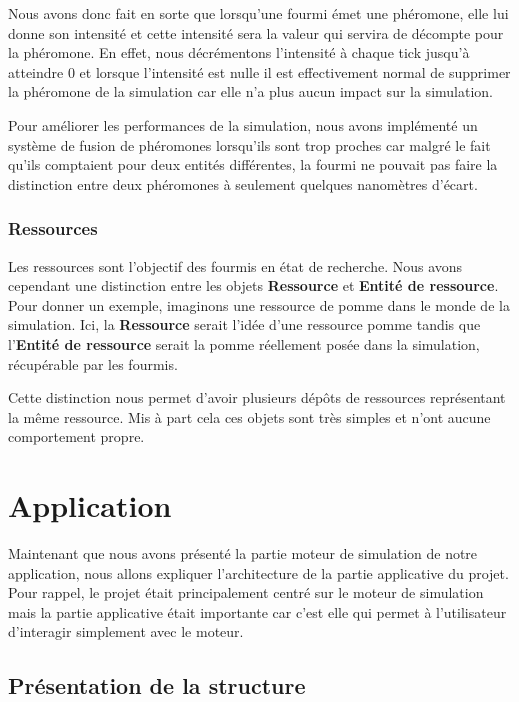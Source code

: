 \documentclass{EPUProjetDi}
\begin{document}
Nous avons donc fait en sorte que lorsqu'une fourmi émet une phéromone, elle lui donne son intensité et cette intensité sera la valeur qui servira de décompte
pour la phéromone. En effet, nous décrémentons l'intensité à chaque tick jusqu'à atteindre 0 et lorsque l'intensité est nulle il est effectivement normal 
de supprimer la phéromone de la simulation car elle n'a plus aucun impact sur la simulation.

Pour améliorer les performances de la simulation, nous avons implémenté un système de fusion de phéromones lorsqu'ils sont trop proches car malgré 
le fait qu'ils comptaient pour deux entités différentes, la fourmi ne pouvait pas faire la distinction entre deux phéromones à seulement quelques 
nanomètres d'écart.

\subsubsection{Ressources}

Les ressources sont l'objectif des fourmis en état de recherche. Nous avons cependant une distinction entre les objets \textbf{Ressource} et 
\textbf{Entité de ressource}. Pour donner un exemple, imaginons une ressource de pomme dans le monde de la simulation. Ici, la \textbf{Ressource}
serait l'idée d'une ressource pomme tandis que l'\textbf{Entité de ressource} serait la pomme réellement posée dans la simulation, récupérable par 
les fourmis.

Cette distinction nous permet d'avoir plusieurs dépôts de ressources représentant la même ressource. Mis à part cela ces objets sont très simples
et n'ont aucune comportement propre.

\section{Application}

Maintenant que nous avons présenté la partie moteur de simulation de notre application, nous allons expliquer l'architecture de la partie applicative du projet.
Pour rappel, le projet était principalement centré sur le moteur de simulation mais la partie applicative était importante car c'est elle qui permet à l'utilisateur 
d'interagir simplement avec le moteur. 

\subsection{Présentation de la structure}
\end{document}
